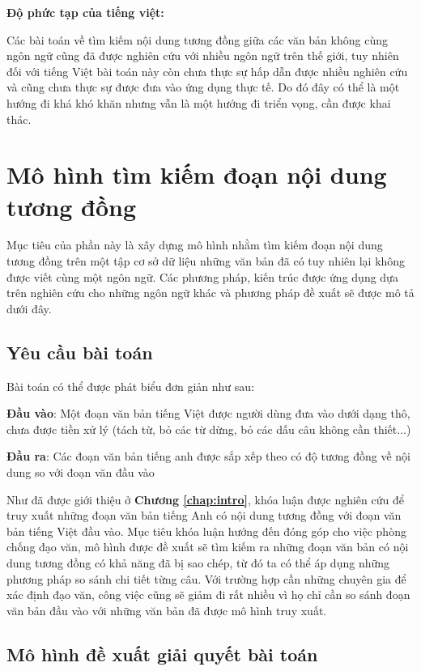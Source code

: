 \documentclass[12pt]{report}
\begin{document}
\noindent\textbf{Độ phức tạp của tiếng việt:}

Các bài toán về tìm kiếm nội dung tương đồng giữa các văn bản không cùng ngôn ngữ cũng đã được nghiên cứu với nhiều ngôn ngữ trên thế giới, tuy nhiên đối với tiếng Việt bài toán này còn chưa thực sự hấp dẫn được nhiều nghiên cứu và cũng chưa thực sự được đưa vào ứng dụng thực tế. Do đó đây có thể là một hướng đi khá khó khăn nhưng vẫn là một hướng đi triển vọng, cần được khai thác.

\chapter{Mô hình tìm kiếm đoạn nội dung tương đồng}
\label{chap:model}
Mục tiêu của phần này là xây dựng mô hình nhằm tìm kiếm đoạn nội dung tương đồng trên một tập cơ sở dữ liệu những văn bản đã có tuy nhiên lại không được viết cùng một ngôn ngữ. Các phương pháp, kiến trúc được ứng dụng dựa trên nghiên cứu cho những ngôn ngữ khác và phương pháp đề xuất sẽ được mô tả dưới đây.
\section{Yêu cầu bài toán}

Bài toán có thể được phát biểu đơn giản như sau:

\textbf{Đầu vào}: Một đoạn văn bản tiếng Việt được người dùng đưa vào dưới dạng thô, chưa được tiền xử lý (tách từ, bỏ các từ dừng, bỏ các dấu câu không cần thiết...)

\textbf{Đầu ra}: Các đoạn văn bản tiếng anh được sắp xếp theo có độ tương đồng về nội dung so với đoạn văn đầu vào 

Như đã được giới thiệu ở \textbf{Chương \ref{chap:intro}}, khóa luận được nghiên cứu để truy xuất những đoạn văn bản tiếng Anh có nội dung tương đồng với đoạn văn bản tiếng Việt đầu vào. Mục tiêu khóa luận hướng đến đóng góp cho việc phòng chống đạo văn, mô hình được đề xuất sẽ tìm kiếm ra những đoạn văn bản có nội dung tương đồng có khả năng đã bị sao chép, từ đó ta có thể áp dụng những phương pháp so sánh chi tiết từng câu. Với trường hợp cần những chuyên gia để xác định đạo văn, công việc cũng sẽ giảm đi rất nhiều vì họ chỉ cần so sánh đoạn văn bản đầu vào với những văn bản đã được mô hình truy xuất.

\section{Mô hình đề xuất giải quyết bài toán}
\end{document}
